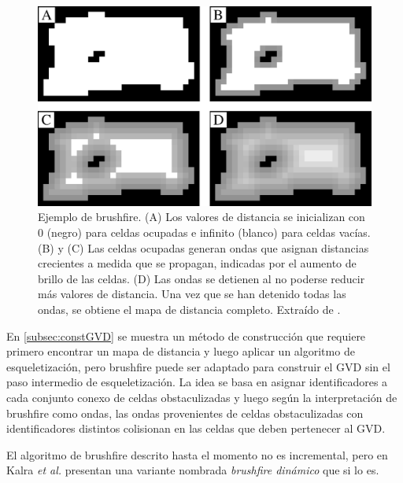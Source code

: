 \begin{figure}[H]
  \center
  \includegraphics[width=1\linewidth]{imagenes/wavesBrush2Rows.png}
  \caption{Ejemplo de brushfire. (A) Los valores de distancia se inicializan con 0 (negro) para celdas ocupadas e infinito (blanco) para celdas vacías. (B) y (C) Las celdas ocupadas generan ondas que asignan distancias crecientes a medida que se propagan, indicadas por el aumento de brillo de las celdas. (D) Las ondas se detienen al no poderse reducir más valores de distancia. Una vez que se han detenido todas las ondas, se obtiene el mapa de distancia completo. Extraído de \cite{Lau2013}.}\label{fig:wavesBrush}
\end{figure} 

En \ref{subsec:constGVD} se muestra un método de construcción que requiere primero encontrar un mapa de distancia y luego aplicar un algoritmo de esqueletización, pero brushfire puede ser adaptado para construir el GVD sin el paso intermedio de esqueletización. La idea se basa en asignar identificadores a cada conjunto conexo de celdas obstaculizadas y luego según la interpretación de brushfire como ondas, las ondas provenientes de celdas obstaculizadas con identificadores distintos colisionan en las celdas que deben pertenecer al GVD. 

El algoritmo de brushfire descrito hasta el momento no es incremental, pero en \cite{kalra2009incremental} Kalra \textit{et al.} presentan una variante nombrada \emph{brushfire dinámico} que si lo es.

